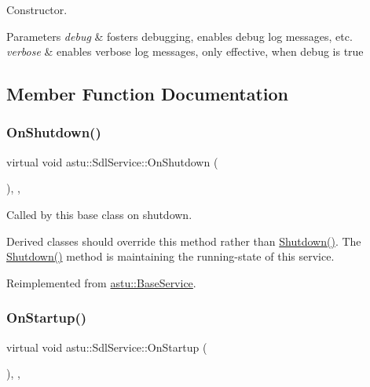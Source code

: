 Constructor.


\begin{DoxyParams}{Parameters}
{\em debug} & fosters debugging, enables debug log messages, etc. \\
\hline
{\em verbose} & enables verbose log messages, only effective, when debug is true \\
\hline
\end{DoxyParams}


\subsection{Member Function Documentation}
\mbox{\label{classastu_1_1SdlService_a20d53237efd1c717d773a8ff121b093b}} 
\subsubsection{\texorpdfstring{On\+Shutdown()}{OnShutdown()}}
{\footnotesize\ttfamily virtual void astu\+::\+Sdl\+Service\+::\+On\+Shutdown (\begin{DoxyParamCaption}{ }\end{DoxyParamCaption})\hspace{0.3cm}{\ttfamily [override]}, {\ttfamily [protected]}, {\ttfamily [virtual]}}

Called by this base class on shutdown.

Derived classes should override this method rather than {\ttfamily \hyperlink{classastu_1_1BaseService_a7095888244052db294d58738c0d187fb}{Shutdown()}}. The {\ttfamily \hyperlink{classastu_1_1BaseService_a7095888244052db294d58738c0d187fb}{Shutdown()}} method is maintaining the running-\/state of this service. 

Reimplemented from \hyperlink{classastu_1_1BaseService_aeb5003f7c5efe5412725ac4c66942d03}{astu\+::\+Base\+Service}.

\mbox{\label{classastu_1_1SdlService_a2fcb46537de794ab6e4f5e043b26ff60}} 
\subsubsection{\texorpdfstring{On\+Startup()}{OnStartup()}}
{\footnotesize\ttfamily virtual void astu\+::\+Sdl\+Service\+::\+On\+Startup (\begin{DoxyParamCaption}{ }\end{DoxyParamCaption})\hspace{0.3cm}{\ttfamily [override]}, {\ttfamily [protected]}, {\ttfamily [virtual]}}

